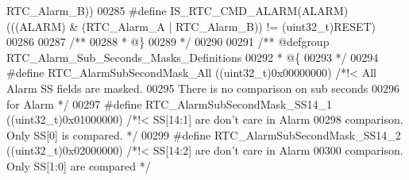 \begin{DoxyCode}
      RTC_Alarm_B\textcolor{preprocessor}{)}\textcolor{preprocessor}{)}
00285 \textcolor{preprocessor}{#}\textcolor{preprocessor}{define} \textcolor{preprocessor}{IS\_RTC\_CMD\_ALARM}\textcolor{preprocessor}{(}\textcolor{preprocessor}{ALARM}\textcolor{preprocessor}{)} \textcolor{preprocessor}{(}\textcolor{preprocessor}{(}\textcolor{preprocessor}{(}\textcolor{preprocessor}{ALARM}\textcolor{preprocessor}{)} \textcolor{preprocessor}{&} \textcolor{preprocessor}{(}RTC_Alarm_A \textcolor{preprocessor}{|} RTC_Alarm_B\textcolor{preprocessor}{)}\textcolor{preprocessor}{)} \textcolor{preprocessor}{!=} \textcolor{preprocessor}{(}\textcolor{preprocessor}{uint32\_t}\textcolor{preprocessor}{)}\textcolor{preprocessor}{RESET}\textcolor{preprocessor}{)}
00286 
00287 \textcolor{comment}{/**}
00288 \textcolor{comment}{  * @\}}
00289 \textcolor{comment}{  */}
00290 
00291   \textcolor{comment}{/** @defgroup RTC\_Alarm\_Sub\_Seconds\_Masks\_Definitions}
00292 \textcolor{comment}{  * @\{}
00293 \textcolor{comment}{  */}
00294 \textcolor{preprocessor}{#}\textcolor{preprocessor}{define} \textcolor{preprocessor}{RTC\_AlarmSubSecondMask\_All}         \textcolor{preprocessor}{(}\textcolor{preprocessor}{(}\textcolor{preprocessor}{uint32\_t}\textcolor{preprocessor}{)}0x00000000\textcolor{preprocessor}{)} \textcolor{comment}{/*!< All Alarm SS fields are masked.
       }
00295 \textcolor{comment}{                                                                       There is no comparison on sub
       seconds }
00296 \textcolor{comment}{                                                                       for Alarm */}
00297 \textcolor{preprocessor}{#}\textcolor{preprocessor}{define} \textcolor{preprocessor}{RTC\_AlarmSubSecondMask\_SS14\_1}      \textcolor{preprocessor}{(}\textcolor{preprocessor}{(}\textcolor{preprocessor}{uint32\_t}\textcolor{preprocessor}{)}0x01000000\textcolor{preprocessor}{)} \textcolor{comment}{/*!< SS[14:1] are don't care in
       Alarm }
00298 \textcolor{comment}{                                                                       comparison. Only SS[0] is
       compared. */}
00299 \textcolor{preprocessor}{#}\textcolor{preprocessor}{define} \textcolor{preprocessor}{RTC\_AlarmSubSecondMask\_SS14\_2}      \textcolor{preprocessor}{(}\textcolor{preprocessor}{(}\textcolor{preprocessor}{uint32\_t}\textcolor{preprocessor}{)}0x02000000\textcolor{preprocessor}{)} \textcolor{comment}{/*!< SS[14:2] are don't care in
       Alarm }
00300 \textcolor{comment}{                                                                       comparison. Only SS[1:0] are
       compared */}

\end{DoxyCode}
